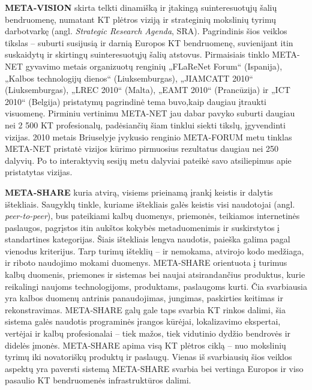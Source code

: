 \documentclass[]{../metanetpaper}
\begin{document}
\begin{multicols}{2}
\textbf{META-VISION}  skirta telkti dinamišką ir įtakingą suinteresuotųjų šalių bendruomenę, numatant KT plėtros viziją ir strateginių mokslinių tyrimų darbotvarkę (angl. \textit{Strategic Research Agenda}, SRA). Pagrindinis šios veiklos tikslas – suburti susijusią ir darnią Europos KT bendruomenę, suvienijant itin suskaidytų ir skirtingų suinteresuotųjų šalių atstovus. Pirmaisiais tinklo META-NET gyvavimo metais organizuotų renginių „FLaReNet Forum“ (Ispanija), „Kalbos technologijų dienos“ (Liuksemburgas), „JIAMCATT 2010“ (Liuksemburgas), „LREC 2010“ (Malta), „EAMT 2010“ (Prancūzija) ir „ICT 2010“ (Belgija) pristatymų pagrindinė tema buvo,kaip daugiau įtraukti visuomenę. Pirminiu vertinimu META-NET jau dabar pavyko suburti daugiau nei 2 500 KT profesionalų, padėsiančių šiam tinklui siekti tikslų, įgyvendinti vizijas. 2010 metais Briuselyje įvykusio renginio META-FORUM metu tinklas META-NET pristatė vizijos kūrimo pirmuosius rezultatus daugiau nei 250 dalyvių. Po to interaktyvių sesijų metu dalyviai pateikė savo atsiliepimus apie pristatytas vizijas.

\textbf{META-SHARE} kuria atvirą, visiems prieinamą įrankį keistis ir dalytis ištekliais. Saugyklų tinkle, kuriame ištekliais galės keistis visi naudotojai (angl. \textit{peer-to-peer}), bus pateikiami kalbų duomenys, priemonės, teikiamos internetinės paslaugos, pagrįstos itin aukštos kokybės metaduomenimis ir suskirstytos į standartines kategorijas. Šiais ištekliais lengva naudotis, paieška galima pagal vienodus kriterijus. Tarp turimų išteklių – ir nemokama, atvirojo kodo medžiaga, ir riboto naudojimo mokami duomenys. META-SHARE orientuota į turimus kalbų duomenis, priemones ir sistemas bei naujai atsirandančius produktus, kurie reikalingi naujoms technologijoms, produktams, paslaugoms kurti. Čia svarbiausia yra kalbos duomenų antrinis panaudojimas, jungimas, paskirties keitimas ir rekonstravimas. META-SHARE galų gale taps svarbia KT rinkos dalimi, šia sistema galės naudotis programinės įrangos kūrėjai, lokalizavimo ekspertai, vertėjai ir kalbų profesionalai – tiek mažos, tiek vidutinio dydžio bendrovės ir didelės įmonės. META-SHARE apima visą KT plėtros ciklą – nuo mokslinių tyrimų iki novatoriškų produktų ir paslaugų. Vienas iš svarbiausių šios veiklos aspektų yra paversti sistemą META-SHARE svarbia bei vertinga Europos ir viso pasaulio KT bendruomenės infrastruktūros dalimi.


\end{multicols}
\end{document}

